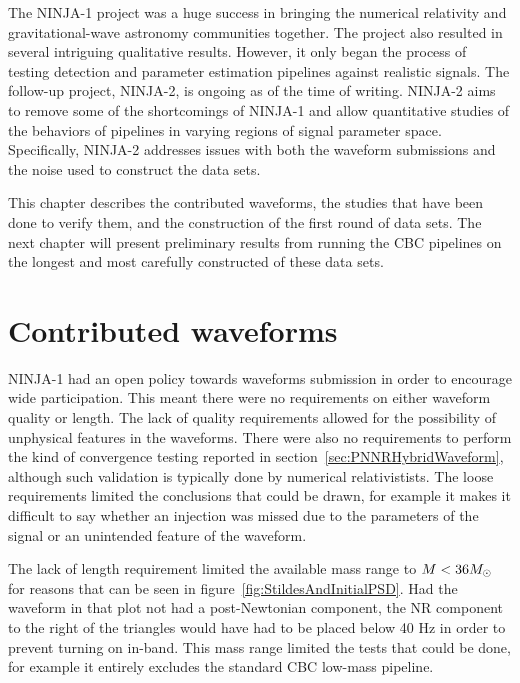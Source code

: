 The NINJA-1 project was a huge success in bringing the numerical
relativity and gravitational-wave astronomy communities together.  The
project also resulted in several intriguing qualitative results.
However, it only began the process of testing detection and parameter
estimation pipelines against realistic signals.  The follow-up
project, NINJA-2, is ongoing as of the time of writing.  NINJA-2 aims
to remove some of the shortcomings of NINJA-1 and allow quantitative
studies of the behaviors of pipelines in varying regions of signal
parameter space.  Specifically, NINJA-2 addresses issues with both the
waveform submissions and the noise used to construct the data sets.

This chapter describes the contributed waveforms, the studies that
have been done to verify them, and the construction of the first round
of data sets.  The next chapter will present preliminary results from
running the CBC pipelines on the longest and most carefully
constructed of these data sets.

\section{Contributed waveforms}

NINJA-1 had an open policy towards waveforms submission in order to
encourage wide participation.  This meant there were no requirements
on either waveform quality or length.  The lack of quality
requirements allowed for the possibility of unphysical features in the
waveforms.  There were also no requirements to perform the kind of
convergence testing reported in section~\ref{sec:PNNRHybridWaveform},
although such validation is typically done by numerical
relativistists.  The loose requirements limited the conclusions that
could be drawn, for example it makes it difficult to say whether an
injection was missed due to the parameters of the signal or an
unintended feature of the waveform.

The lack of length requirement limited the available mass range to $M
< 36 M_\odot$ for reasons that can be seen in
figure~\ref{fig:StildesAndInitialPSD}.   Had the waveform in that plot
not had a post-Newtonian component, the NR component to the right of
the triangles would have had to be placed below 40 Hz in order to
prevent turning on in-band.  This mass range limited the tests that
could be done, for example it entirely excludes the standard CBC
low-mass pipeline.

